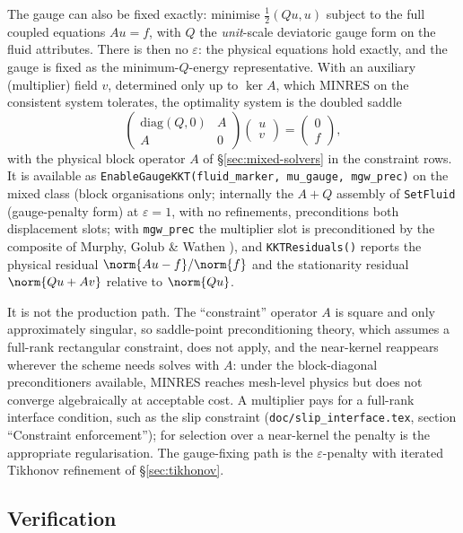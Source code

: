 \documentclass[11pt]{article}
\numberwithin{equation}{section}
\theoremstyle{remark}
\newcommand{\eps}{\varepsilon}
\newcommand{\code}[1]{\texttt{#1}}
\begin{document}
The gauge can also be fixed exactly: minimise $\frac12(Qu,u)$ subject to
the full coupled equations $Au = f$, with $Q$ the \emph{unit}-scale
deviatoric gauge form on the fluid attributes. There is then no $\eps$:
the physical equations hold exactly, and the gauge is fixed as the
minimum-$Q$-energy representative. With an auxiliary (multiplier) field
$v$, determined only up to $\ker A$, which MINRES on the consistent system
tolerates, the optimality system is the doubled saddle
\begin{equation}
  \begin{pmatrix} \mathrm{diag}(Q, 0) & A\\ A & 0\end{pmatrix}
  \begin{pmatrix} u\\ v\end{pmatrix} =
  \begin{pmatrix} 0\\ f\end{pmatrix},
\end{equation}
with the physical block operator $A$ of \S\ref{sec:mixed-solvers} in the
constraint rows. It is available as \code{EnableGaugeKKT(fluid\_marker,
mu\_gauge, mgw\_prec)} on the mixed class (block organisations only;
internally the $A + Q$ assembly of \code{SetFluid} (gauge-penalty form) at $\eps = 1$,
with no refinements, preconditions both displacement slots; with
\code{mgw\_prec} the multiplier slot is preconditioned by the composite of
Murphy, Golub \& Wathen \cite{MurphyGolubWathen2000}), and
\code{KKTResiduals()} reports the physical residual $\norm{Au - f}/\norm{f}$
and the stationarity residual $\norm{Qu + Av}$ relative to $\norm{Qu}$.

It is not the production path. The ``constraint'' operator $A$ is square
and only approximately singular, so saddle-point preconditioning theory,
which assumes a full-rank rectangular constraint, does not apply, and the
near-kernel reappears wherever the scheme needs solves with $A$: under the
block-diagonal preconditioners available, MINRES reaches mesh-level physics
but does not converge algebraically at acceptable cost. A multiplier pays
for a full-rank interface condition, such as the slip constraint
(\code{doc/slip\_interface.tex}, section ``Constraint enforcement'');
for selection over a near-kernel the penalty is the appropriate regularisation. The gauge-fixing path is the
$\eps$-penalty with iterated Tikhonov refinement of \S\ref{sec:tikhonov}.

\subsection{Verification}
\label{sec:gauged-verif}
\end{document}
